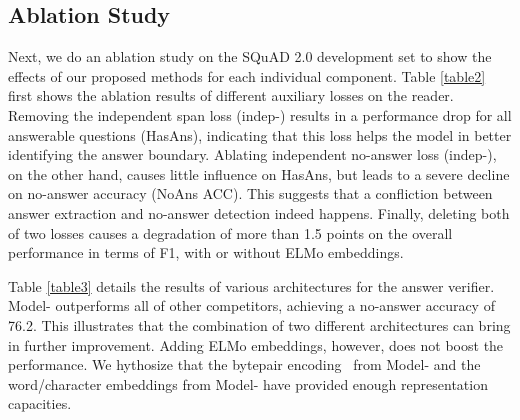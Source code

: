 \documentclass[letterpaper]{article} \usepackage{aaai19}  \usepackage{times}  \usepackage{helvet}  \usepackage{courier}  \usepackage{url}  \usepackage{graphicx}  \usepackage{pbox}
\begin{document}
\subsection{Ablation Study}
Next, we do an ablation study on the SQuAD 2.0 development set to show the effects of our proposed methods for each individual component.
Table \ref{table2} first shows the ablation results of different auxiliary losses on the reader.
Removing the independent span loss (indep-\uppercase\expandafter{}) results in a performance drop for all answerable questions (HasAns), indicating that this loss helps the model in better identifying the answer boundary.
Ablating independent no-answer loss (indep-\uppercase\expandafter{}), on the other hand, causes little influence on HasAns, but leads to a severe decline on no-answer accuracy (NoAns ACC).
This suggests that a confliction between answer extraction and no-answer detection indeed happens.
Finally, deleting both of two losses causes a degradation of more than 1.5 points on the overall performance in terms of F1, with or without ELMo embeddings.

Table \ref{table3} details the results of various architectures for the answer verifier.
Model-\uppercase\expandafter{} outperforms all of other competitors, achieving a no-answer accuracy of 76.2. 
This illustrates that the combination of two different architectures can bring in further improvement.
Adding ELMo embeddings, however, does not boost the performance. 
We hythosize that the bytepair encoding~\cite{Sennrich16} from Model-\uppercase\expandafter{} and the word/character embeddings from Model-\uppercase\expandafter{} have provided enough representation capacities.
\end{document}
